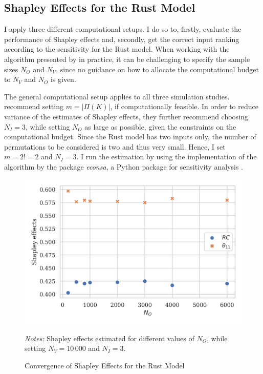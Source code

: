 \subsection{Shapley Effects for the Rust Model} \label{shapley_rust_model}

I apply three different computational setups. I do so to, firstly, evaluate the performance of Shapley effects and, secondly, get the correct input ranking according to the sensitivity for the Rust model. When working with the algorithm presented by \citet{SNS16} in practice, it can be challenging to specify the sample sizes $N_O$ and $N_V$, since no guidance on how to allocate the computational budget to $N_V$ and $N_O$ is given.

The general computational setup applies to all three simulation studies. \citet{SNS16} recommend setting $m=\vert \Pi(K) \vert$, if computationally feasible. In order to reduce variance of the estimates of Shapley effects, they further recommend choosing $N_I=3$, while setting $N_O$ as large as possible, given the constraints on the computational budget. Since the Rust model has two inputs only, the number of permutations to be considered is two and thus very small. Hence, I set $m=2!=2$ and $N_I=3$. I run the estimation by using the implementation of the algorithm by the package \textit{econsa}, a Python package for sensitivity analysis \citep{OSE21}.


\begin{figure}[t]
	\caption{Convergence of Shapley Effects for the Rust Model}
    \label{shapley_convergence}
	\begin{centering}
	\vspace*{-4mm}
	\begin{centering}
	\includegraphics[scale=0.9]{../figures/convergence_shapley_effects_8.png}
	\end{centering}
	\end{centering}

	\small
	\textit{Notes:} Shapley effects estimated for different values of $N_O$, while setting $N_V=10\,000$ and $N_I=3$.
\end{figure}

